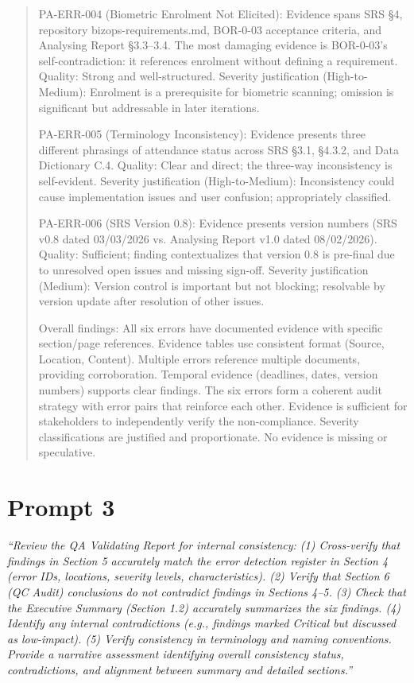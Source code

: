 \documentclass[11pt,a4paper]{article}
\begin{document}
\begin{quote}
PA-ERR-004 (Biometric Enrolment Not Elicited): Evidence spans SRS \S4, repository bizops-requirements.md, BOR-0-03 acceptance criteria, and Analysing Report \S3.3--3.4. The most damaging evidence is BOR-0-03's self-contradiction: it references enrolment without defining a requirement. Quality: Strong and well-structured. Severity justification (High-to-Medium): Enrolment is a prerequisite for biometric scanning; omission is significant but addressable in later iterations.

PA-ERR-005 (Terminology Inconsistency): Evidence presents three different phrasings of attendance status across SRS \S3.1, \S4.3.2, and Data Dictionary C.4. Quality: Clear and direct; the three-way inconsistency is self-evident. Severity justification (High-to-Medium): Inconsistency could cause implementation issues and user confusion; appropriately classified.

PA-ERR-006 (SRS Version 0.8): Evidence presents version numbers (SRS v0.8 dated 03/03/2026 vs. Analysing Report v1.0 dated 08/02/2026). Quality: Sufficient; finding contextualizes that version 0.8 is pre-final due to unresolved open issues and missing sign-off. Severity justification (Medium): Version control is important but not blocking; resolvable by version update after resolution of other issues.

Overall findings: All six errors have documented evidence with specific section/page references. Evidence tables use consistent format (Source, Location, Content). Multiple errors reference multiple documents, providing corroboration. Temporal evidence (deadlines, dates, version numbers) supports clear findings. The six errors form a coherent audit strategy with error pairs that reinforce each other. Evidence is sufficient for stakeholders to independently verify the non-compliance. Severity classifications are justified and proportionate. No evidence is missing or speculative.
\end{quote}

\newpage

\section*{Prompt 3}

\textit{``Review the QA Validating Report for internal consistency: (1) Cross-verify that findings in Section 5 accurately match the error detection register in Section 4 (error IDs, locations, severity levels, characteristics). (2) Verify that Section 6 (QC Audit) conclusions do not contradict findings in Sections 4--5. (3) Check that the Executive Summary (Section 1.2) accurately summarizes the six findings. (4) Identify any internal contradictions (e.g., findings marked Critical but discussed as low-impact). (5) Verify consistency in terminology and naming conventions. Provide a narrative assessment identifying overall consistency status, contradictions, and alignment between summary and detailed sections.''}
\end{document}
